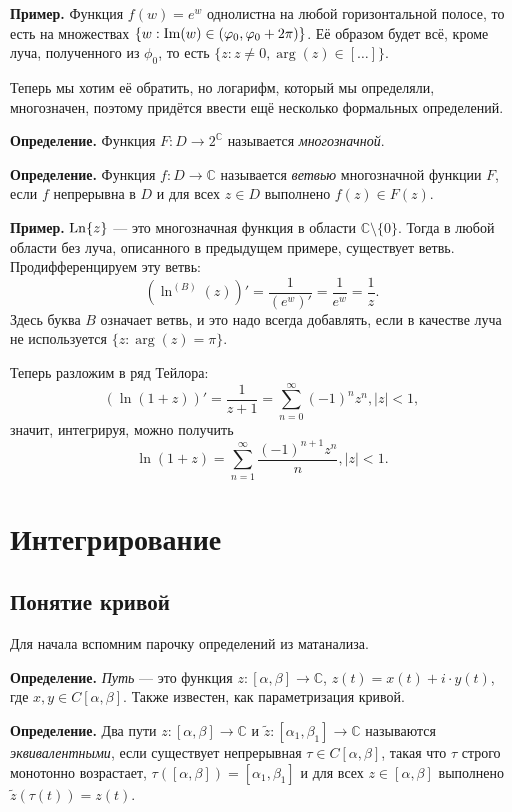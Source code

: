 \textbf{Пример.} Функция $f(w) = e^w$ однолистна на любой горизонтальной полосе, то есть на множествах $\{w: \operatorname{Im}(w) \in (\varphi_0, \varphi_0 + 2\pi)\}$.
Её образом будет всё, кроме луча, полученного из $\phi_0$, то есть $\{z: z \ne 0, \arg(z) \in [\dots]\}$.

Теперь мы хотим её обратить, но логарифм, который мы определяли, многозначен, поэтому придётся ввести ещё несколько формальных определений.

\textbf{Определение.} Функция $F: D \to 2^{\mathbb C}$ называется \textit{многозначной}.

\textbf{Определение.} Функция $f: D \to \mathbb C$ называется \textit{ветвью} многозначной функции $F$, если $f$ непрерывна в $D$ и для всех $z \in D$ выполнено $f(z) \in F(z)$.

\textbf{Пример.} $\operatorname{Ln}\{z\}$ --- это многозначная функция в области $\mathbb C \setminus \{0\}$.
Тогда в любой области без луча, описанного в предыдущем примере, существует ветвь.
Продифференцируем эту ветвь:
\[
    (\ln^{(B)}(z))' = \frac{1}{(e^w)'} = \frac{1}{e^w} = \frac{1}{z}.
\]
Здесь буква $B$ означает ветвь, и это надо всегда добавлять, если в качестве луча не используется $\{z: \arg(z) = \pi\}$.

Теперь разложим в ряд Тейлора:
\[
    (\ln(1 + z))' = \frac{1}{z + 1} = \sum_{n=0}^{\infty} (-1)^n z^n, |z| < 1,
\]
значит, интегрируя, можно получить
\[
    \ln(1 + z) = \sum_{n=1}^{\infty} \frac{(-1)^{n+1} z^n}{n}, |z| < 1.
\]

\section{Интегрирование}
\subsection{Понятие кривой}
Для начала вспомним парочку определений из матанализа.

\textbf{Определение.} \textit{Путь} --- это функция $z: [\alpha, \beta] \to \mathbb C$, $z(t) = x(t) + i \cdot y(t)$, где $x, y \in C[\alpha, \beta]$.
Также известен, как параметризация кривой.

\textbf{Определение.} Два пути $z: [\alpha, \beta] \to \mathbb C$ и $\tilde z: [\alpha_1, \beta_1] \to \mathbb C$ называются \textit{эквивалентными}, если существует непрерывная $\tau \in C[\alpha, \beta]$, такая что $\tau$ строго монотонно возрастает, $\tau([\alpha, \beta]) = [\alpha_1, \beta_1]$ и для всех $z \in [\alpha, \beta]$ выполнено $\tilde z(\tau(t)) = z(t)$.


